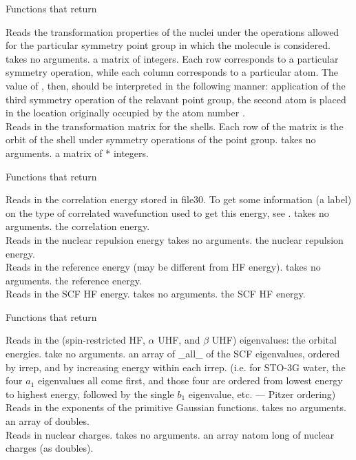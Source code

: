 \begin{center}
Functions that return 
\end{center}
{Reads the transformation properties of the nuclei
under the operations allowed for the particular symmetry point group
in which the molecule is considered.}
{takes no arguments.}
{a matrix of integers. Each row corresponds
to a particular symmetry operation, while each column corresponds to
a particular atom.  The value of , then, should be interpreted
in the following manner: application of the third symmetry operation of 
the relavant point group, the second atom is placed in the location
originally occupied by the atom number .} \\
{Reads in the transformation matrix for the shells. Each row of the 
matrix is the orbit of the shell under symmetry operations of the point 
group.}
{takes no arguments.}
{a matrix of * integers.}

\begin{center}
Functions that return 
\end{center}
{Reads in the correlation energy stored in file30. To get some
information (a label) on the type of correlated wavefunction
used to get this energy, see .}
{takes no arguments.}
{the correlation energy.} \\
{Reads in the nuclear repulsion energy}
{takes no arguments.}
{the nuclear repulsion energy.} \\
{Reads in the reference energy (may be different from HF energy).}
{takes no arguments.}
{the reference energy.} \\
{Reads in the SCF HF energy.}
{takes no arguments.}
{the SCF HF energy.}

\begin{center}
Functions that return 
\end{center}
{Reads in the (spin-restricted HF, $\alpha$ UHF, and $\beta$ UHF) eigenvalues:
the orbital energies.}
{take no arguments.}
{an array of \_all\_ of the SCF eigenvalues,
ordered by irrep, and by increasing energy within each irrep.
(i.e. for STO-3G water, the four $a_1$ eigenvalues all come first, and
those four are ordered from lowest energy to highest energy,
followed by the single $b_1$ eigenvalue, etc. --- Pitzer ordering)} \\
{Reads in the exponents of the primitive Gaussian functions.}
{takes no arguments.}
{an array of doubles.} \\
{Reads in nuclear charges.}
{takes no arguments.}
{an array natom long of nuclear charges (as doubles).}

